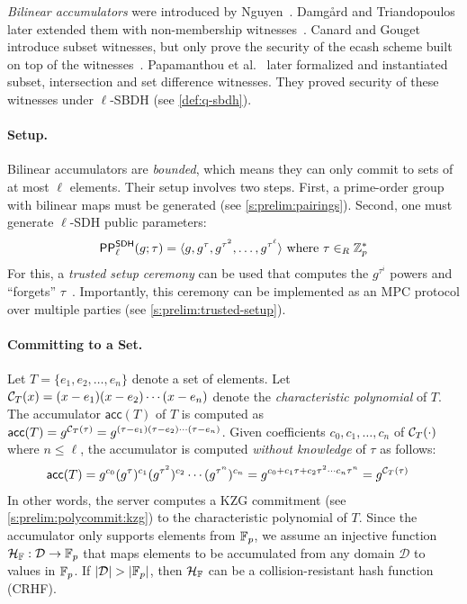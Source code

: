 \textit{Bilinear accumulators} were introduced by Nguyen~\cite{Nguyen05}.
Damg{\aa}rd and Triandopoulos later extended them with non-membership witnesses~\cite{DT08}.
Canard and Gouget introduce subset witnesses, but only prove the security of the ecash scheme built on top of the witnesses~\cite{CG10}. 
Papamanthou et al.~\cite{PTT11} later formalized and instantiated subset, intersection and set difference witnesses.
They proved security of these witnesses under $\ell$-SBDH (see \cref{def:q-sbdh}).

\paragraph{Setup.}
Bilinear accumulators are \textit{bounded}, which means they can only commit to sets of at most $\ell$ elements.
Their setup involves two steps.
First, a prime-order group with bilinear maps must be generated (see \cref{s:prelim:pairings}).
Second, one must generate $\ell$-SDH public parameters:
$$\PPsdh_\ell(g;\tau) = \langle g,g^\tau,g^{\tau^2},\dots, g^{\tau^\ell} \rangle\ \text{where}\ \tau\in_R \Zp^*$$
For this, a \textit{trusted setup ceremony} can be used that computes the $g^{\tau^i}$ powers and ``forgets'' $\tau$~\cite{zcash-mpc1,zcash-mpc2}.
Importantly, this ceremony can be implemented as an MPC protocol over multiple parties (see \cref{s:prelim:trusted-setup}).

\paragraph{Committing to a Set.}
Let $T = \{e_1, e_2, \dots, e_n\}$ denote a set of elements.
Let $\mathcal{C}_T(x) = (x-e_1)(x-e_2)\cdots(x-e_n)$ denote the \textit{characteristic polynomial} of $T$.
The accumulator $\mathsf{acc}(T)$ of $T$ is computed as $\mathsf{acc}(T) = g^{\mathcal{C}_T(\tau)} = g^{(\tau-e_1)(\tau-e_2)\cdots(\tau-e_n)}$.
Given coefficients $c_0, c_1, \dots, c_{n}$ of $\mathcal{C}_T(\cdot)$ where $n \le \ell$, the accumulator is computed \textit{without knowledge} of $\tau$ as follows:
\begin{align*}
\small
\mathsf{acc}(T)
    &= g^{c_0} (g^\tau)^{c_1} (g^{\tau^2})^{c_2} \cdots (g^{\tau^{n}})^{c_{n}}
    = g^{c_0 + c_1 \tau + c_2 \tau^2 \cdots c_{n} \tau^{n}}
    = g^{\mathcal{C}_T(\tau)}
\end{align*}
In other words, the server computes a KZG commitment (see \cref{s:prelim:polycommit:kzg}) to the characteristic polynomial of $T$.
Since the accumulator only supports elements from $\mathbb{F}_p$, we assume an injective function $\mathcal{H}_{\mathbb{F}}: \mathcal{D}\rightarrow \mathbb{F}_p$ that maps elements to be accumulated from any domain $\mathcal{D}$ to values in $\mathbb{F}_p$.
If $|\mathcal{D}|>|\Fp|$, then $\mathcal{H}_{\mathbb{F}}$ can be a collision-resistant hash function (CRHF).

